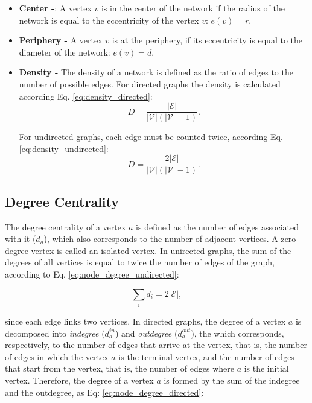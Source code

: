 \begin{itemize}
    \item \textbf{Center -}: A vertex $v$ is in the center of the network if the radius of the network is equal to the eccentricity of the vertex $v$: $e(v) = r$.
        
    \item \textbf{Periphery -} A vertex $v$ is at the periphery, if its eccentricity is equal to the diameter of the network: $e(v) = d$.
    	
    \item \textbf{Density -} The density of a network is defined as the ratio of edges to the number of possible edges. For directed graphs the density is calculated according Eq. \ref{eq:density_directed}:
        \begin{equation}
            \label{eq:density_directed}
            D=\frac {|\mathcal{E}|}{|\mathcal{V}|(|\mathcal{V}|-1)}.
    	\end{equation}
    
    For undirected graphs, each edge must be counted twice, according Eq. \ref{eq:density_undirected}:
        \begin{equation}
            \label{eq:density_undirected}
            D=\frac {2|\mathcal{E}|}{|\mathcal{V}|(|\mathcal{V}|-1)}.
    	\end{equation}
\end{itemize}

\subsection*{Degree Centrality}
\label{subsec:degree_centr}
The degree centrality of a vertex $a$ is defined as the number of edges associated with it ($d_a$), which also corresponds to the number of adjacent vertices. A zero-degree vertex is called an isolated vertex. In unirected graphs, the sum of the degrees of all vertices is equal to twice the number of edges of the graph, according to Eq. \ref{eq:node_degree_undirected}:

\begin{equation} 
\label{eq:node_degree_undirected}
    \sum_{i}d_i = 2\left | \mathcal{E} \right |,
\end{equation}

since each edge links two vertices. In directed graphs, the degree of a vertex $a$ is decomposed into {\em indegree} ($d_a^{in}$) and {\em outdegree} ($d_a^{out}$), the which corresponds, respectively, to the number of edges that arrive at the vertex, that is, the number of edges in which the vertex $a$ is the terminal vertex, and the number of edges that start from the vertex, that is, the number of edges where $a$ is the initial vertex. Therefore, the degree of a vertex $a$ is formed by the sum of the indegree and the outdegree, as Eq: \ref{eq:node_degree_directed}:

